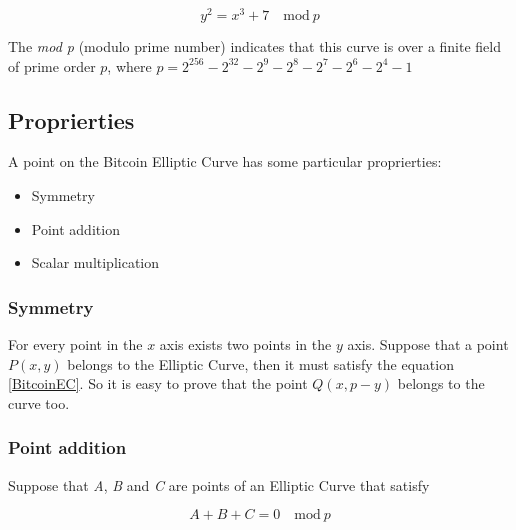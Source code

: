 \begin{equation}\label{BitcoinEC}
y^2=x^3+7 \quad \textrm{mod} \ p
\end{equation}

The \textit{mod p} (modulo prime number) indicates that this curve is over a finite field of prime order $p$, where $p=2^{256}-2^{32}-2^9-2^8-2^7-2^6-2^4-1$

\subsection{Proprierties}
A point on the Bitcoin Elliptic Curve has some particular proprierties:
\begin{itemize}
	\item Symmetry
	\item Point addition
	\item Scalar multiplication
\end{itemize}

\subsubsection{Symmetry}
For every point in the $x$ axis exists two points in the $y$ axis. Suppose that a point $P(x,y)$ belongs to the Elliptic Curve, then it must satisfy the equation \ref{BitcoinEC}.
So it is easy to prove that the point $Q(x,p-y)$ belongs to the curve too.

\subsubsection{Point addition}
Suppose that \textit{A}, \textit{B} and \textit{C} are points of an Elliptic Curve that satisfy

\begin{equation}\label{Point addition}
A+B+C=0 \quad \textrm{mod} \ p
\end{equation}








